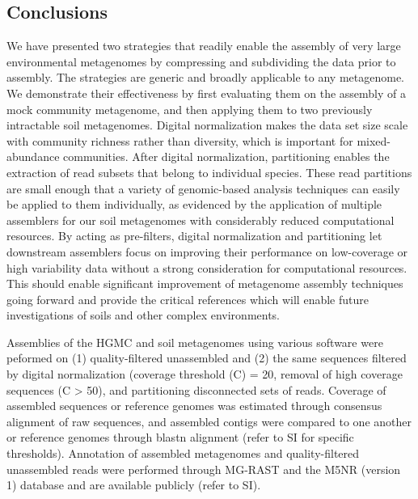 \documentclass{pnastwo}
\begin{document}
\begin{article}
\subsection{Conclusions}
We have presented two strategies that readily enable the assembly of very large
environmental metagenomes by compressing and subdividing the data
prior to assembly. The strategies are generic and broadly applicable to any
metagenome. We demonstrate their effectiveness by first evaluating them on the
assembly of a mock community metagenome, and then applying them to two
previously intractable soil metagenomes.  Digital normalization makes the data set size scale with community richness rather than diversity, which is important for mixed-abundance communities. After digital normalization, partitioning enables the extraction of read subsets that belong to
individual species. These read partitions are small enough that a variety of
genomic-based analysis techniques can easily be 
applied to them individually, as evidenced by the application of multiple assemblers for our soil metagenomes with considerably reduced 
computational resources. By acting as
pre-filters, digital normalization and partitioning let downstream assemblers 
focus on improving their performance on low-coverage or high variability data
without a strong consideration for computational resources. This should enable
significant improvement of metagenome assembly techniques going forward and
provide the critical references which will enable future investigations of soils
and other complex environments.

\begin{materials} Assemblies of the HGMC and
soil metagenomes using various software were peformed on (1) quality-filtered
unassembled and (2) the same sequences filtered by digital normalization
(coverage threshold (C) = 20, removal of high coverage sequences (C > 50), and partitioning disconnected sets
of reads. Coverage of assembled sequences or reference genomes was estimated
through consensus alignment of raw sequences, and assembled contigs were
compared to one another or reference genomes through blastn alignment (refer to
SI for specific thresholds). Annotation of assembled metagenomes and
quality-filtered unassembled reads were performed through MG-RAST and the M5NR
(version 1) database and are available publicly (refer to SI). \end{materials}



\end{article}
\end{document}

